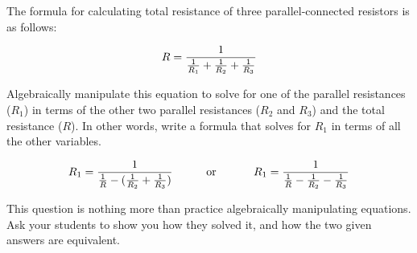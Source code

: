 

The formula for calculating total resistance of three parallel-connected resistors is as follows:

$$R = {1 \over {{1 \over R_1} + {1 \over R_2} + {1 \over R_3}}}$$

Algebraically manipulate this equation to solve for one of the parallel resistances ($R_1$) in terms of the other two parallel resistances ($R_2$ and $R_3$) and the total resistance ($R$).  In other words, write a formula that solves for $R_1$ in terms of all the other variables.







$$R_1 = {1 \over {{1 \over R} - ({1 \over R_2} + {1 \over R_3})}} \hbox{\hskip 30pt or \hskip 30pt} R_1 = {1 \over {{1 \over R} - {1 \over R_2} - {1 \over R_3}}}$$







This question is nothing more than practice algebraically manipulating equations.  Ask your students to show you how they solved it, and how the two given answers are equivalent.





